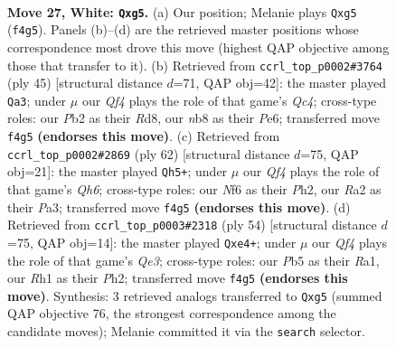 \documentclass[11pt]{article}
\begin{document}
\clearpage

\begin{figure}[p]\centering
\begin{subfigure}{0.46\textwidth}\centering
\resizebox{\linewidth}{!}{%
\newchessgame
\chessboard[
  setfen={rn1q3r/5k2/1p1p1N2/pPp3p1/4PQ2/7P/RP4P1/2K4R w - - 2 27},
  showmover=false,
  pgfstyle=straightmove, color=movearrow, markmove={f4-g5}
]}
\caption{}
\end{subfigure}\hfill
\begin{subfigure}{0.46\textwidth}\centering
\resizebox{\linewidth}{!}{%
\newchessgame
\chessboard[
  setfen={r2r2k1/p4pp1/4pn1p/2q5/2P5/1N5P/P3QPP1/1R1R2K1 b - - 1 23},
  showmover=false,
  pgfstyle=straightmove, color=movearrow, markmove={c5-a3}
]}
\caption{}
\end{subfigure}
\\[4pt]
\begin{subfigure}{0.46\textwidth}\centering
\resizebox{\linewidth}{!}{%
\newchessgame
\chessboard[
  setfen={1q5r/5k1p/1p2p2Q/p3np2/2N5/PP1p2P1/5P1P/2R3K1 w - - 0 32},
  showmover=false,
  pgfstyle=straightmove, color=movearrow, markmove={h6-h5}
]}
\caption{}
\end{subfigure}\hfill
\begin{subfigure}{0.46\textwidth}\centering
\resizebox{\linewidth}{!}{%
\newchessgame
\chessboard[
  setfen={r3k3/p2n2p1/2p2q1p/8/3Np3/4Q3/P1P2PPP/R5K1 w - - 2 28},
  showmover=false,
  pgfstyle=straightmove, color=movearrow, markmove={e3-e4}
]}
\caption{}
\end{subfigure}
\caption{\textbf{Move 27, White: \texttt{Qxg5}.} (a) Our position; Melanie plays \texttt{Qxg5} (\texttt{f4g5}). Panels (b)--(d) are the retrieved master positions whose correspondence most drove this move (highest QAP objective among those that transfer to it). (b) Retrieved from \texttt{ccrl\_top\_p0002\#3764} (ply 45) [structural distance $d$=71, QAP obj=42]: the master played \texttt{Qa3}; under $\mu$ our \emph{Qf4} plays the role of that game's \emph{Qc4}; cross-type roles: our \emph{P}b2 as their \emph{R}d8, our \emph{n}b8 as their \emph{P}e6; transferred move \texttt{f4g5} \textbf{(endorses this move)}. (c) Retrieved from \texttt{ccrl\_top\_p0002\#2869} (ply 62) [structural distance $d$=75, QAP obj=21]: the master played \texttt{Qh5+}; under $\mu$ our \emph{Qf4} plays the role of that game's \emph{Qh6}; cross-type roles: our \emph{N}f6 as their \emph{P}h2, our \emph{R}a2 as their \emph{P}a3; transferred move \texttt{f4g5} \textbf{(endorses this move)}. (d) Retrieved from \texttt{ccrl\_top\_p0003\#2318} (ply 54) [structural distance $d$=75, QAP obj=14]: the master played \texttt{Qxe4+}; under $\mu$ our \emph{Qf4} plays the role of that game's \emph{Qe3}; cross-type roles: our \emph{P}b5 as their \emph{R}a1, our \emph{R}h1 as their \emph{P}h2; transferred move \texttt{f4g5} \textbf{(endorses this move)}. Synthesis: 3 retrieved analogs transferred to \texttt{Qxg5} (summed QAP objective 76, the strongest correspondence among the candidate moves); Melanie committed it via the \texttt{search} selector.}
\label{fig:thought-m52}
\end{figure}
\end{document}
